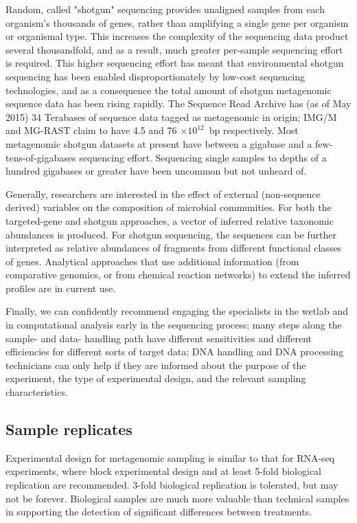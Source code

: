 \documentclass[graybox]{svmult}
\begin{document}
Random, called "shotgun" sequencing provides unaligned samples from each organism's thousands of genes, rather than amplifying a single gene per organism or organismal type.  This increases the complexity of the sequencing data product several thousandfold, and as a result, much greater per-sample sequencing effort is required.
This higher sequencing effort has meant that environmental shotgun sequencing has been enabled disproportionately by low-cost sequencing technologies, and as a consequence the total amount of shotgun metagenomic sequence data has been rising rapidly.   The Sequence Read Archive has (as of May 2015) 34 Terabases of sequence data tagged as metagenomic in origin; IMG/M and MG-RAST claim to have 4.5  and 76 $\times 10^{12}$~bp respectively. 
Most metagenomic shotgun datasets at present have between a gigabase and a few-tens-of-gigabases sequencing effort.  
Sequencing single samples to depths of a hundred gigabases or greater have been uncommon but not unheard of.

Generally, researchers are interested in the effect of external (non-sequence derived) variables on the composition of microbial communities.  For both the targeted-gene and shotgun approaches, a vector of inferred relative taxonomic abundances is produced.  For shotgun sequencing, the sequences can be further interpreted as relative abundances of fragments from different functional classes of genes.  Analytical approaches that use additional information (from comparative genomics, or from chemical reaction networks) to extend the inferred profiles are in current use.  

Finally, we can confidently recommend engaging the specialists in the wetlab and in computational analysis early in the sequencing process; many steps along the sample- and data- handling path have different sensitivities and different efficiencies for different sorts of target data; DNA handling and DNA processing technicians can only help if they are informed about the purpose of the experiment, the type of experimental design, and the relevant sampling characteristics.  

\subsection{Sample replicates} 
\label{subsec:2}
%
Experimental design for metagenomic sampling is similar to that for RNA-seq experiments, where block experimental design and at least 5-fold biological replication are recommended.  3-fold biological replication is tolerated, but may not be forever.   Biological samples are much more valuable than technical samples in supporting the detection of significant differences between treatments. 
\end{document}
